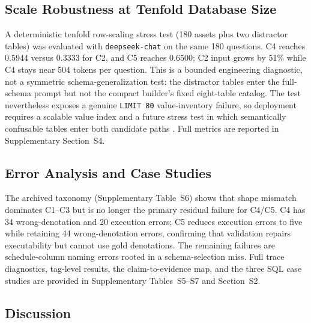 \documentclass[cmc,article,submit,moreauthors,pdftex]{Definitions/tsp}
\begin{document}
\subsection{Scale Robustness at Tenfold Database Size}\label{scale-robustness}

A deterministic tenfold row-scaling stress test (180 assets plus two distractor tables) was evaluated with \texttt{deepseek-chat} on the same 180 questions. C4 reaches 0.5944 versus 0.3333 for C2, and C5 reaches 0.6500; C2 input grows by 51\% while C4 stays near 504 tokens per question. This is a bounded engineering diagnostic, not a symmetric schema-generalization test: the distractor tables enter the full-schema prompt but not the compact builder's fixed eight-table catalog. The test nevertheless exposes a genuine \texttt{LIMIT 80} value-inventory failure, so deployment requires a scalable value index and a future stress test in which semantically confusable tables enter both candidate paths \cite{talaei2024chess}. Full metrics are reported in Supplementary Section~S4.

\subsection{Error Analysis and Case Studies}\label{sect:r5}

The archived taxonomy (Supplementary Table~S6) shows that shape mismatch dominates C1--C3 but is no longer the primary residual failure for C4/C5. C4 has 34 wrong-denotation and 20 execution errors; C5 reduces execution errors to five while retaining 44 wrong-denotation errors, confirming that validation repairs executability but cannot use gold denotations. The remaining failures are schedule-column naming errors rooted in a schema-selection miss. Full trace diagnostics, tag-level results, the claim-to-evidence map, and the three SQL case studies are provided in Supplementary Tables~S5--S7 and Section~S2.

\subsection{Discussion}\label{sect:r6}
\end{document}
